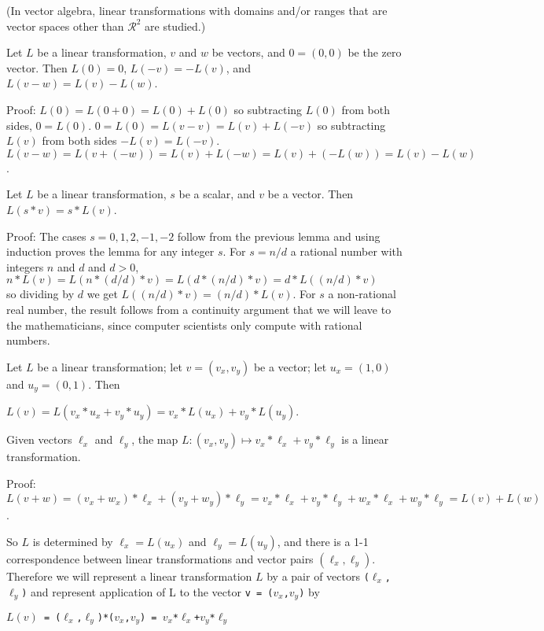 \documentclass[12pt]{article}
\begin{document}
(In vector algebra, linear transformations with domains and/or ranges
that are vector spaces other than $\mathcal{R}^2$ are studied.)


\begin{lemma}
Let $L$ be a linear transformation, $v$ and $w$ be vectors,
and $0=(0,0)$ be the zero vector.  Then $L(0)=0$,  $L(-v)=-L(v)$,
and $L(v-w) = L(v) - L(w)$.
\end{lemma}
\begin{indpar}{0.5in}
Proof: $L(0) = L(0+0)= L(0) + L(0)$ so subtracting $L(0)$
from both sides, $0=L(0)$.  $0 = L(0) = L(v-v) = L(v) + L(-v)$
so subtracting $L(v)$ from both sides $-L(v)=L(-v)$.
$L(v-w)=L(v+(-w))=L(v)+L(-w)=L(v)+(-L(w))=L(v)-L(w)$.
\end{indpar}

\begin{lemma}
Let $L$ be a linear transformation, $s$ be a scalar, and $v$ be a vector.
Then $L(s*v)=s*L(v)$.
\end{lemma}
\begin{indpar}{0.5in}
Proof: The cases $s=0,1,2,-1,-2$ follow from the previous lemma and
using induction proves the lemma for any integer $s$.  For $s=n/d$
a rational number with integers $n$ and $d$ and $d>0$, \\
\hspace*{0.1in}$n*L(v) = L(n*(d/d)*v) = L(d*(n/d)*v)=d*L((n/d)*v)$ \\
so dividing by $d$
we get $L((n/d)*v)=(n/d)*L(v)$.  For $s$ a non-rational real number,
the result follows from a continuity argument that we will leave
to the mathematicians, since computer scientists only compute
with rational numbers.
\end{indpar}

Let $L$ be a linear transformation; let $v=(v_x,v_y)$ be a vector;
let $u_x=(1,0)$ and $u_y =(0,1)$.  Then \\
\centerline{$L(v) = L(v_x*u_x+v_y*u_y)=v_x*L(u_x)+v_y*L(u_y)$.}

\begin{lemma}
Given vectors $\ell_x$ and $\ell_y$, the map
$L:(v_x,v_y)\longmapsto v_x*\ell_x+v_y*\ell_y$ is a linear
transformation.
\end{lemma}
\begin{indpar}{0.5in}
Proof: $L(v+w) = (v_x+w_x)*\ell_x+(v_y+w_y)*\ell_y
               = v_x*\ell_x+v_y*\ell_y+w_x*\ell_x+w_y*\ell_y
	       = L(v) + L(w)$.
\end{indpar}

So $L$ is determined by $\ell_x = L(u_x)$ and $\ell_y = L(u_y)$,
and there is a 1-1 correspondence between linear transformations
and vector pairs $(\ell_x,\ell_y)$.  Therefore we will represent a linear
transformation $L$ by a pair of vectors {\tt ($\ell_x$,$\ell_y$)}
and represent application of L to the vector {\tt v = ($v_x$,$v_y$)} by \\
\centerline{\tt $L(v)$ = ($\ell_x$,$\ell_y$)*($v_x$,$v_y$) =
             $v_x$*$\ell_x$+$v_y$*$\ell_y$}
\end{document}
